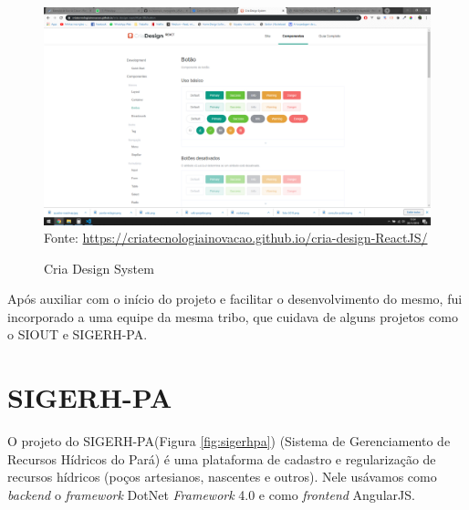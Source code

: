 \begin{figure}[H]
\centering
\caption{Cria Design System} %
\includegraphics[scale=0.3]{cria-design}\\  %
{\small Fonte: \url{https://criatecnologiainovacao.github.io/cria-design-ReactJS/}} %
\label{fig:criaDesign} %
\end{figure}

Após auxiliar com o início do projeto e facilitar o desenvolvimento do mesmo, fui incorporado a uma equipe da mesma tribo, que cuidava de alguns projetos como o SIOUT e SIGERH-PA.

\section{SIGERH-PA}

O projeto do SIGERH-PA(Figura \ref{fig:sigerhpa}) (Sistema de Gerenciamento de Recursos Hídricos do Pará) é uma plataforma de cadastro e regularização de recursos hídricos (poços artesianos, nascentes e outros).
Nele usávamos como \textit{backend} o \textit{framework} DotNet \textit{Framework} 4.0 e como \textit{frontend} AngularJS.

